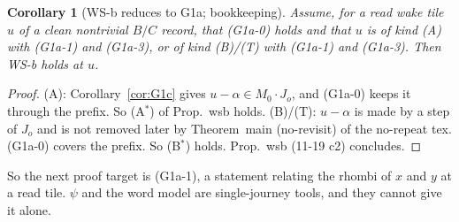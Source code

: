 \documentclass[11pt]{article}
\newtheorem{corollary}[theorem]{Corollary}
\theoremstyle{definition}\newtheorem{definition}[theorem]{Definition}\newtheorem{remark}[theorem]{Remark}
\begin{document}
\begin{corollary}[WS-b reduces to G1a; bookkeeping]\label{cor:wsb}
Assume, for a read wake tile $u$ of a clean nontrivial $B/C$ record, that (G1a-0) holds and that $u$ is of kind (A) with (G1a-1) and (G1a-3), or of kind (B)/(T) with (G1a-1) and (G1a-3). Then WS-b holds at $u$.
\end{corollary}
\begin{proof}
(A): Corollary~\ref{cor:G1c} gives $u-\alpha\in M_0\cdot J_o$, and (G1a-0) keeps it through the prefix. So (A$^*$) of Prop.~wsb holds.
(B)/(T): $u-\alpha$ is made by a step of $J_o$ and is not removed later by Theorem~main (no-revisit) of the no-repeat tex. (G1a-0) covers the prefix. So (B$^*$) holds.
Prop.~wsb (11-19 c2) concludes.
\end{proof}
So the next proof target is (G1a-1), a statement relating the rhombi of $x$ and $y$ at a read tile. $\psi$ and the word model are single-journey tools, and they cannot give it alone.
\end{document}
